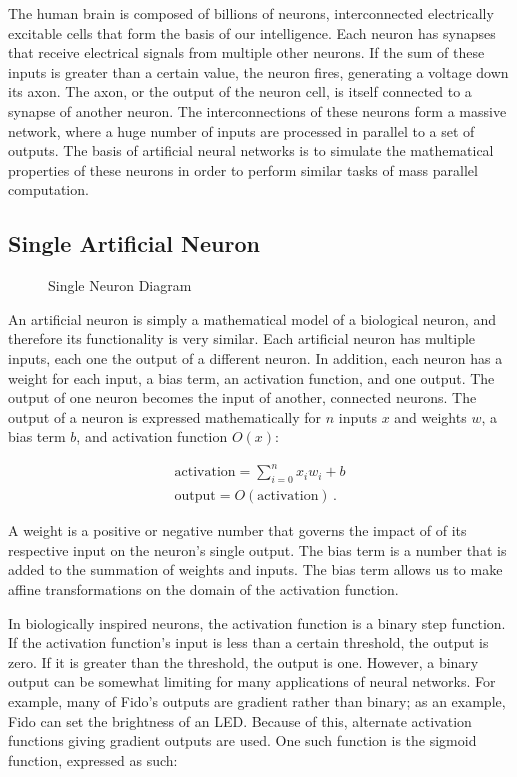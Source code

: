 The human brain is composed of billions of neurons, interconnected electrically excitable cells that form the basis of our intelligence. Each neuron has synapses that receive electrical signals from multiple other neurons. If the sum of these inputs is greater than a certain value, the neuron fires, generating a voltage down its axon. The axon, or the output of the neuron cell, is itself connected to a synapse of another neuron. The interconnections of these neurons form a massive network, where a huge number of inputs are processed in parallel to a set of outputs. The basis of artificial neural networks is to simulate the mathematical properties of these neurons in order to perform similar tasks of mass parallel computation.


\subsection{Single Artificial Neuron}

\begin{figure}[ht]
	\centering
	
	\caption{Single Neuron Diagram}
\end{figure}

An artificial neuron is simply a mathematical model of a biological neuron, and therefore its functionality is very similar. Each artificial neuron has multiple inputs, each one the output of a different neuron. In addition, each neuron has a weight for each input, a bias term, an activation function, and one output. The output of one neuron becomes the input of another, connected neurons. The output of a neuron is expressed mathematically for $n$ inputs $x$ and weights $w$, a bias term $b$, and activation function $O(x)$:

\begin{align*}
	\text{activation} = \sum_{i=0}^{n}x_i w_i + b\\
	\text{output} = O(\text{activation})
	\,.
\end{align*}

A weight is a positive or negative number that governs the impact of of its respective input on the neuron's single output. The bias term is a number that is added to the summation of weights and inputs. The bias term allows us to make affine transformations on the domain of the activation function. 

In biologically inspired neurons, the activation function is a binary step function. If the activation function's input is less than a certain threshold, the output is zero. If it is greater than the threshold, the output is one. However, a binary output can be somewhat limiting for many applications of neural networks. For example, many of Fido's outputs are gradient rather than binary; as an example, Fido can set the brightness of an LED. Because of this, alternate activation functions giving gradient outputs are used. One such function is the sigmoid function, expressed as such:

